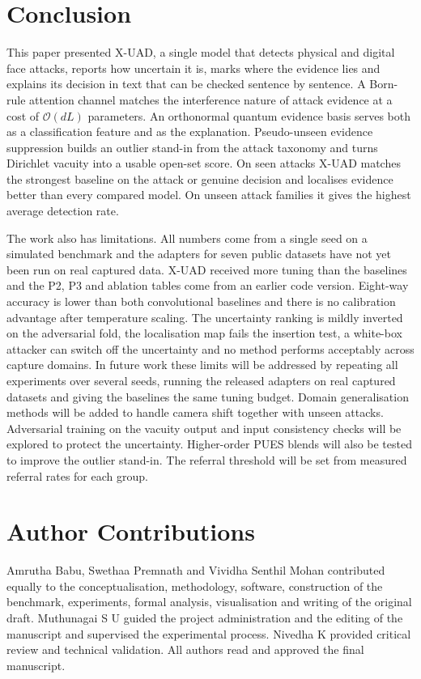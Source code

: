 \documentclass[conference]{IEEEtran}
\begin{document}
\section{Conclusion}\label{sec:concl}
This paper presented X-UAD, a single model that detects physical and digital face
attacks, reports how uncertain it is, marks where the evidence lies and explains its
decision in text that can be checked sentence by sentence. A Born-rule attention
channel matches the interference nature of attack evidence at a cost of
$\mathcal{O}(dL)$ parameters. An orthonormal quantum evidence basis serves both as a
classification feature and as the explanation. Pseudo-unseen evidence suppression
builds an outlier stand-in from the attack taxonomy and turns Dirichlet vacuity into a
usable open-set score. On seen attacks X-UAD matches the strongest baseline on the
attack or genuine decision and localises evidence better than every compared model.
On unseen attack families it gives the highest average detection rate.

The work also has limitations. All numbers come from a single seed on a simulated
benchmark and the adapters for seven public datasets have not yet been run on real
captured data. X-UAD received more tuning than the baselines and the P2, P3 and
ablation tables come from an earlier code version. Eight-way accuracy is lower than
both convolutional baselines and there is no calibration advantage after temperature
scaling. The uncertainty ranking is mildly inverted on the adversarial fold, the
localisation map fails the insertion test, a white-box attacker can switch off the
uncertainty and no method performs acceptably across capture domains. In future work
these limits will be addressed by repeating all experiments over several seeds,
running the released adapters on real captured datasets and giving the baselines the
same tuning budget. Domain generalisation methods will be added to handle camera
shift together with unseen attacks. Adversarial training on the vacuity output and
input consistency checks will be explored to protect the uncertainty. Higher-order
PUES blends will also be tested to improve the outlier stand-in. The referral threshold
will be set from measured referral rates for each group.

\FloatBarrier
\section*{Author Contributions}
Amrutha Babu, Swethaa Premnath and Vividha Senthil Mohan contributed equally to the
conceptualisation, methodology, software, construction of the benchmark,
experiments, formal analysis, visualisation and writing of the original draft.
Muthunagai S U guided the project administration and the editing of the manuscript
and supervised the experimental process. Nivedha K provided critical review and
technical validation. All authors read and approved the final manuscript.
\end{document}
